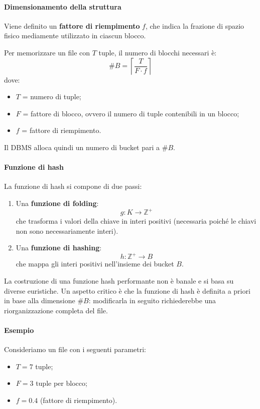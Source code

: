 \paragraph{Dimensionamento della struttura}

Viene definito un \textbf{fattore di riempimento} $f$, che indica la frazione di spazio fisico mediamente utilizzato in ciascun blocco.

Per memorizzare un file con $T$ tuple, il numero di blocchi necessari è:
\[
\#B = \left\lceil \frac{T}{F \cdot f} \right\rceil
\]
dove:
\begin{itemize}
	\item $T$ = numero di tuple;
	\item $F$ = fattore di blocco, ovvero il numero di tuple contenibili in un blocco;
	\item $f$ = fattore di riempimento.
\end{itemize}

Il DBMS alloca quindi un numero di bucket pari a $\#B$.

\paragraph{Funzione di hash}

La funzione di hash si compone di due passi:

\begin{enumerate}
	\item Una \textbf{funzione di folding}:
	\[
	g : K \to \mathbb{Z}^+
	\]
	che trasforma i valori della chiave in interi positivi (necessaria poiché le chiavi non sono necessariamente interi).
	
	\item Una \textbf{funzione di hashing}:
	\[
	h : \mathbb{Z}^+ \to B
	\]
	che mappa gli interi positivi nell'insieme dei bucket $B$.
\end{enumerate}

La costruzione di una funzione hash performante non è banale e si basa su diverse euristiche. Un aspetto critico è che la funzione di hash è definita a priori in base alla dimensione $\#B$: modificarla in seguito richiederebbe una riorganizzazione completa del file.


\paragraph{Esempio}

Consideriamo un file con i seguenti parametri:
\begin{itemize}
	\item $T = 7$ tuple;
	\item $F = 3$ tuple per blocco;
	\item $f = 0.4$ (fattore di riempimento).
\end{itemize}

